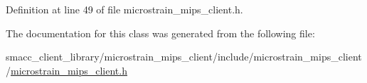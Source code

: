Definition at line 49 of file microstrain\+\_\+mips\+\_\+client.\+h.



The documentation for this class was generated from the following file\+:\begin{DoxyCompactItemize}
\item 
smacc\+\_\+client\+\_\+library/microstrain\+\_\+mips\+\_\+client/include/microstrain\+\_\+mips\+\_\+client/\hyperlink{microstrain__mips__client_8h}{microstrain\+\_\+mips\+\_\+client.\+h}\end{DoxyCompactItemize}

